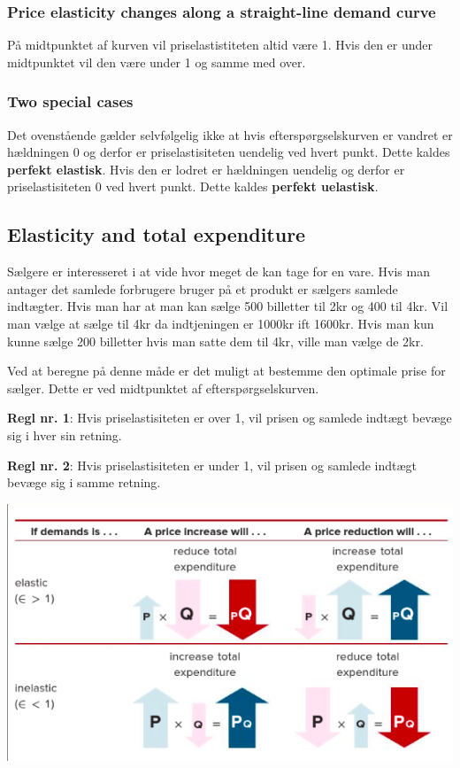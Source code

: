 \subsubsection{Price elasticity changes along a straight-line demand curve}
På midtpunktet af kurven vil priselastistiteten altid være 1. Hvis den er under midtpunktet vil den være under 1 og samme med over. 
\subsubsection{Two special cases}
Det ovenstående gælder selvfølgelig ikke at hvis efterspørgselskurven er vandret er hældningen 0 og derfor er priselastisiteten uendelig ved hvert punkt. Dette kaldes \textbf{perfekt elastisk}. Hvis den er lodret er hældningen uendelig og derfor er priselastisiteten 0 ved hvert punkt. Dette kaldes \textbf{perfekt uelastisk}.

\subsection{Elasticity and total expenditure}
Sælgere er interesseret i at vide hvor meget de kan tage for en vare. Hvis man antager det samlede forbrugere bruger på et produkt er sælgers samlede indtægter. Hvis man har at man kan sælge 500 billetter til 2kr og 400 til 4kr. Vil man vælge at sælge til 4kr da indtjeningen er 1000kr ift 1600kr. Hvis man kun kunne sælge 200 billetter hvis man satte dem til 4kr, ville man vælge de 2kr. 

Ved at beregne på denne måde er det muligt at bestemme den optimale prise for sælger. Dette er ved midtpunktet af efterspørgselskurven. 

\textbf{Regl nr. 1}: Hvis priselastisiteten er over 1, vil prisen og samlede indtægt bevæge sig i hver sin retning. 

\textbf{Regl nr. 2}:  Hvis priselastisiteten er under 1, vil prisen og samlede indtægt bevæge sig i samme retning. 

\includegraphics[scale=0.8]{Afsnit/Lektion1/ElastisitetPQ.png}

